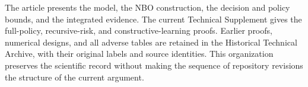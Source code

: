 The article presents the model, the NBO construction, the decision and policy
bounds, and the integrated evidence. The current Technical Supplement gives
the full-policy, recursive-risk, and constructive-learning proofs. Earlier
proofs, numerical designs, and all adverse tables are retained in the
Historical Technical Archive, with their original labels and source
identities. This organization preserves the scientific record without making
the sequence of repository revisions the structure of the current argument.
